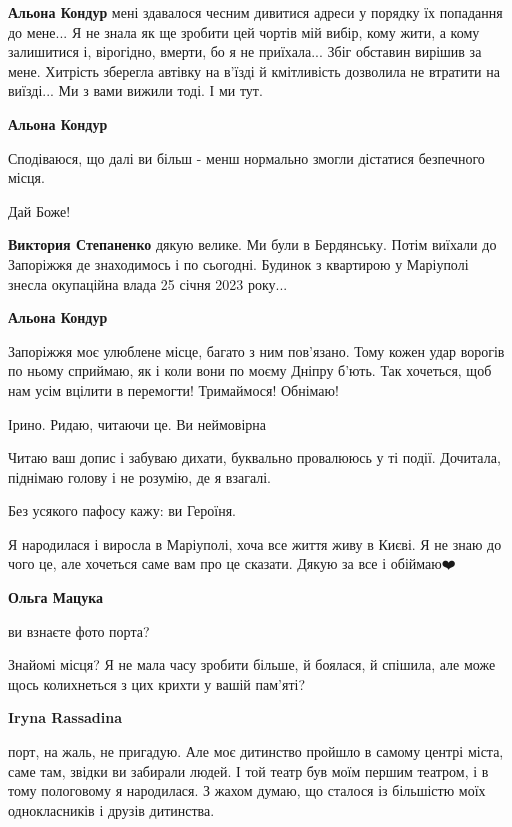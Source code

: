 \begin{itemize} %
\textbf{Альона Кондур} мені здавалося чесним дивитися адреси у порядку їх попадання до мене...
Я не знала як ще зробити цей чортів мій вибір, кому жити, а кому залишитися і, вірогідно, вмерти, бо я не приїхала...
Збіг обставин вирішив за мене.
Хитрість зберегла автівку на в'їзді й кмітливість дозволила не втратити на виїзді...
Ми з вами вижили тоді.
І ми тут.

\textbf{Альона Кондур} 

Сподіваюся, що далі ви більш - менш нормально змогли дістатися безпечного місця.

Дай Боже!

\textbf{Виктория Степаненко} дякую велике.
Ми були в Бердянську. Потім виїхали до Запоріжжя де знаходимось і по сьогодні.
Будинок з квартирою у Маріуполі знесла окупаційна влада 25 січня 2023 року...

\textbf{Альона Кондур}

\obeycr
Запоріжжя моє улюблене місце, багато з ним пов'язано.
Тому кожен удар ворогів по ньому сприймаю, як і коли вони по моєму Дніпру б'ють.
Так хочеться, щоб нам усім вцілити в перемогти!
Тримаймося!
Обнімаю!
\restorecr

\end{itemize} %


Ірино. Ридаю, читаючи це. Ви неймовірна


Читаю ваш допис і забуваю дихати, буквально провалююсь у ті події. Дочитала, піднімаю голову і не розумію, де я взагалі.

Без усякого пафосу кажу: ви Героїня.

Я народилася і виросла в Маріуполі, хоча все життя живу в Києві. Я не знаю до
чого це, але хочеться саме вам про це сказати. Дякую за все і обіймаю❤️

\begin{itemize} %
\textbf{Ольга Мацука} 

ви взнаєте фото порта?

Знайомі місця? Я не мала часу зробити більше, й боялася, й спішила, але може
щось колихнеться з цих крихти у вашій пам'яті? 🌼

\textbf{Iryna Rassadina} 

порт, на жаль, не пригадую. Але моє дитинство пройшло в самому центрі міста,
саме там, звідки ви забирали людей. І той театр був моїм першим театром, і в
тому пологовому я народилася. З жахом думаю, що сталося із більшістю моїх
однокласників і друзів дитинства.

\end{itemize} %

